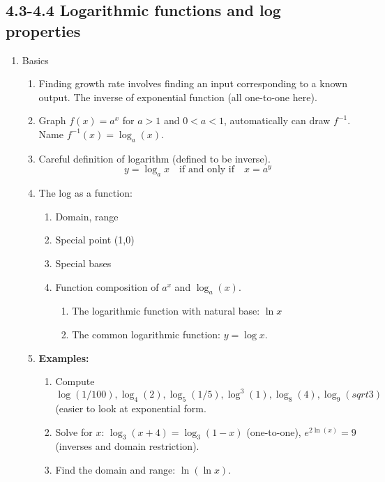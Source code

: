 \documentclass{article}
\begin{document}
\subsection{4.3-4.4 Logarithmic functions and log properties}


\begin{enumerate}
\item Basics
\begin{enumerate}
\item Finding growth rate involves finding an input corresponding to a known output. The inverse of exponential function (all one-to-one here).
\item Graph $f(x)=a^x$ for $a>1$ and $0<a<1$, automatically can draw $f^{-1}$. Name $f^{-1}(x)=\log_a(x)$.
\item Careful definition of logarithm (defined to be inverse).
$$
y = \log_ax \quad\text{if and only if}\quad x = a^y
$$
\item The log as a function:
\begin{enumerate}
\item Domain, range
\item Special point (1,0)
\item Special bases
\item Function composition of $a^x$ and $\log_a(x)$.
\begin{enumerate}
\item The logarithmic function with natural base: $\ln x$
\item The common logarithmic function: $y = \log x$.
\end{enumerate}
\end{enumerate}
\item {\bf Examples:} 
\begin{enumerate}
\item Compute $\log(1/100), \log_4(2), \log_5(1/5), \log^3(1), \log_8(4), \log_9(sqrt{3})$ (easier to look at exponential form.
\item Solve for $x$: $\log_3(x+4)=\log_3(1-x)$ (one-to-one), $e^{2\ln(x)} = 9$ (inverses and domain restriction).  
\item Find the domain and range: $\ln(\ln x)$.
\end{enumerate}
\end{enumerate}


\end{enumerate}
\end{document}

